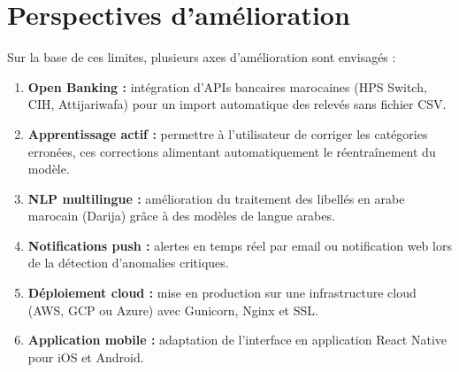 \documentclass[12pt,a4paper]{report}
\begin{document}
\section*{Perspectives d'amélioration}

Sur la base de ces limites, plusieurs axes d'amélioration sont envisagés :

\begin{enumerate}[noitemsep]
  \item \textbf{Open Banking :} intégration d'APIs bancaires marocaines
    (HPS Switch, CIH, Attijariwafa) pour un import automatique des
    relevés sans fichier CSV.
  \item \textbf{Apprentissage actif :} permettre à l'utilisateur de
    corriger les catégories erronées, ces corrections alimentant
    automatiquement le réentraînement du modèle.
  \item \textbf{NLP multilingue :} amélioration du traitement des
    libellés en arabe marocain (Darija) grâce à des modèles de
    langue arabes.
  \item \textbf{Notifications push :} alertes en temps réel par email
    ou notification web lors de la détection d'anomalies critiques.
  \item \textbf{Déploiement cloud :} mise en production sur une
    infrastructure cloud (AWS, GCP ou Azure) avec Gunicorn, Nginx
    et SSL.
  \item \textbf{Application mobile :} adaptation de l'interface en
    application React Native pour iOS et Android.
\end{enumerate}
\end{document}
